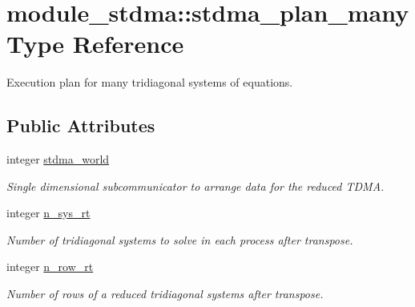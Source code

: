 \hypertarget{structmodule__stdma_1_1stdma__plan__many}{}\section{module\+\_\+stdma\+::stdma\+\_\+plan\+\_\+many Type Reference}
\label{structmodule__stdma_1_1stdma__plan__many}


Execution plan for many tridiagonal systems of equations.  


\subsection*{Public Attributes}
\begin{DoxyCompactItemize}
\item 
integer \mbox{\hyperlink{structmodule__stdma_1_1stdma__plan__many_a047841250c4299bb9ae46f6793547f9e}{stdma\+\_\+world}}
\begin{DoxyCompactList}\small\item\em Single dimensional subcommunicator to arrange data for the reduced T\+D\+MA. \end{DoxyCompactList}\item 
integer \mbox{\hyperlink{structmodule__stdma_1_1stdma__plan__many_a53ea9079aa233209ed3079699ca5189d}{n\+\_\+sys\+\_\+rt}}
\begin{DoxyCompactList}\small\item\em Number of tridiagonal systems to solve in each process after transpose. \end{DoxyCompactList}\item 
integer \mbox{\hyperlink{structmodule__stdma_1_1stdma__plan__many_a4af0f905183855a4a3ae7caaf5e455c6}{n\+\_\+row\+\_\+rt}}
\begin{DoxyCompactList}\small\item\em Number of rows of a reduced tridiagonal systems after transpose. \end{DoxyCompactList}\end{DoxyCompactItemize}
\textbf{ }\par
